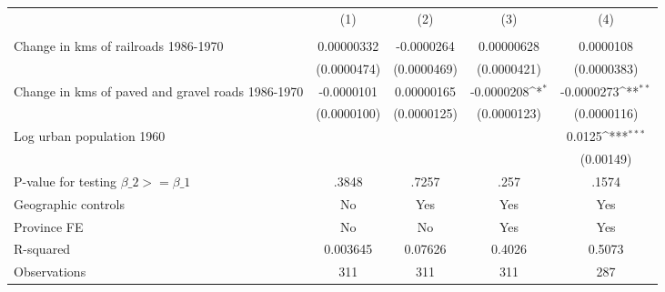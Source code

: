 {
\def\sym#1{\ifmmode^{#1}\else\(^{#1}\)\fi}
\begin{tabular}{l*{4}{c}}
\hline\hline
                &\multicolumn{1}{c}{(1)}&\multicolumn{1}{c}{(2)}&\multicolumn{1}{c}{(3)}&\multicolumn{1}{c}{(4)}\\
                &\multicolumn{1}{c}{}&\multicolumn{1}{c}{}&\multicolumn{1}{c}{}&\multicolumn{1}{c}{}\\
\hline
Change in kms of railroads 1986-1970&0.00000332         &-0.0000264         &0.00000628         &0.0000108         \\
                &(0.0000474)         &(0.0000469)         &(0.0000421)         &(0.0000383)         \\
[1em]
Change in kms of paved and gravel roads 1986-1970&-0.0000101         &0.00000165         &-0.0000208\sym{*}  &-0.0000273\sym{**} \\
                &(0.0000100)         &(0.0000125)         &(0.0000123)         &(0.0000116)         \\
[1em]
Log urban population 1960&                  &                  &                  &   0.0125\sym{***}\\
                &                  &                  &                  &(0.00149)         \\
\hline
P-value for testing $\beta\_{2} >= \beta\_{1}$&    .3848         &    .7257         &     .257         &    .1574         \\
Geographic controls&       No         &      Yes         &      Yes         &      Yes         \\
Province FE     &       No         &       No         &      Yes         &      Yes         \\
R-squared       & 0.003645         &  0.07626         &   0.4026         &   0.5073         \\
Observations    &      311         &      311         &      311         &      287         \\
\hline\hline
\end{tabular}
}
